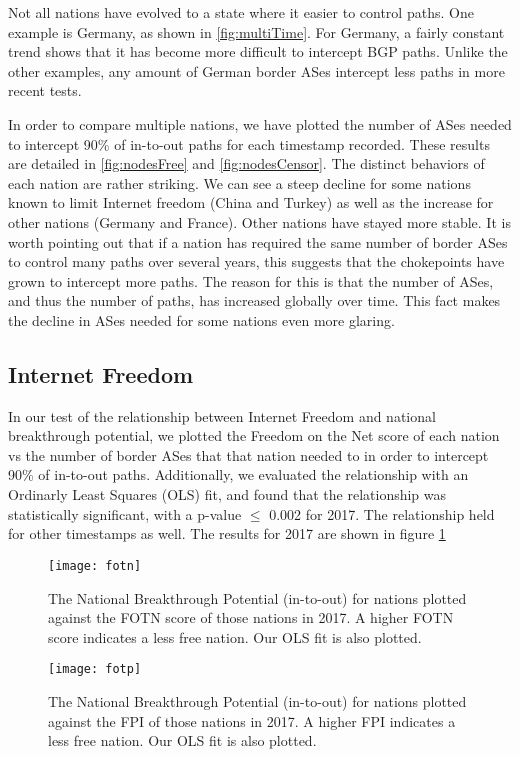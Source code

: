 Not all nations have evolved to a state where it easier to control paths. One
example is Germany, as shown in \figurename \ref{fig:multiTime}. For Germany, a
fairly constant trend shows that it has become more difficult to intercept BGP
paths. Unlike the other examples, any amount of German border ASes intercept
less paths in more recent tests.

In order to compare multiple nations, we have plotted the number of ASes needed
to intercept 90\% of in-to-out paths for each timestamp recorded. These results
are detailed in \figurename \ref{fig:nodesFree} and \figurename
\ref{fig:nodesCensor}.  The distinct behaviors of each nation are rather
striking. We can see a steep decline for some nations known to limit Internet
freedom (China and Turkey) as well as the increase for other nations (Germany
and France). Other nations have stayed more stable. It is worth pointing out
that if a nation has required the same number of border ASes to control many
paths over several years, this suggests that the chokepoints have grown to
intercept more paths. The reason for this is that the number of ASes, and thus
the number of paths, has increased globally over time. This fact makes the
decline in ASes needed for some nations even more glaring.


\subsection{Internet Freedom}

In our test of the relationship between Internet Freedom and national
breakthrough potential, we plotted the Freedom on the Net score of each nation
vs the number of border ASes that that nation needed to in order to intercept
90\% of in-to-out paths. Additionally, we evaluated the relationship with an
Ordinarly Least Squares (OLS) fit, and found that the relationship was
statistically significant, with a p-value $\leq$ 0.002 for 2017. The
relationship held for other timestamps as well. The results for 2017 are shown
in figure \ref{fig:fotn}

\begin{figure}
	\centering
	\texttt{[image: fotn]}
	\caption{The National Breakthrough Potential (in-to-out) for nations plotted against the FOTN score
	of those nations in 2017. A higher FOTN score indicates a less free nation. Our OLS fit is also plotted.}\label{fig:fotn}
\end{figure}

\begin{figure}
	\centering
	\texttt{[image: fotp]}
	\caption{The National Breakthrough Potential (in-to-out) for nations plotted against the FPI
	of those nations in 2017. A higher FPI indicates a less free nation. Our OLS fit is also plotted.}\label{fig:fotp}
\end{figure}

